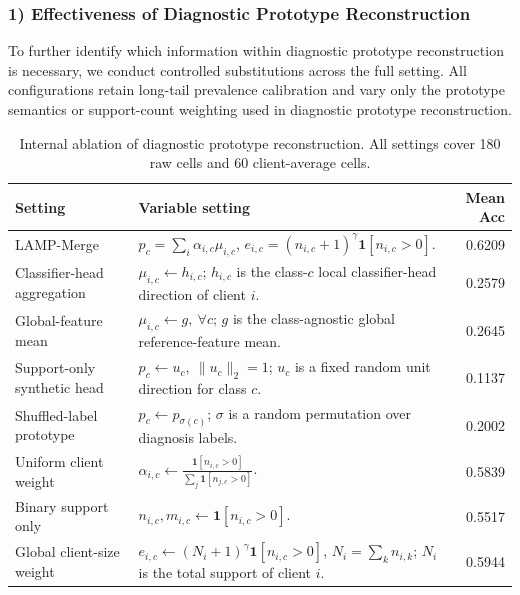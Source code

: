 \documentclass[letterpaper]{article} %
\begin{document}
\subsubsection{1) Effectiveness of Diagnostic Prototype Reconstruction}
To further identify which information within diagnostic prototype reconstruction is necessary, we conduct controlled substitutions across the full setting. All configurations retain long-tail prevalence calibration and vary only the prototype semantics or support-count weighting used in diagnostic prototype reconstruction.

\begin{table}[t]
\centering
\caption{Internal ablation of diagnostic prototype reconstruction. All settings cover 180 raw cells and 60 client-average cells.}
\label{tab:diagnostic-internal-ablation}
\scriptsize
\setlength{\tabcolsep}{2.5pt}
\begin{tabular}{p{}p{}r}
\hline
Setting & Variable setting & Mean Acc \\
\hline
LAMP-Merge & \(p_c=\sum_i\alpha_{i,c}\mu_{i,c}\), \(e_{i,c}=(n_{i,c}+1)^\gamma\mathbf{1}[n_{i,c}>0]\).  & 0.6209 \\
Classifier-head aggregation & \(\mu_{i,c}\leftarrow h_{i,c}\); \(h_{i,c}\) is the class-\(c\) local classifier-head direction of client \(i\). & 0.2579 \\
Global-feature mean & \(\mu_{i,c}\leftarrow g,\ \forall c\); \(g\) is the class-agnostic global reference-feature mean. & 0.2645 \\
Support-only synthetic head & \(p_c\leftarrow u_c,\ \|u_c\|_2=1\); \(u_c\) is a fixed random unit direction for class \(c\). & 0.1137 \\
Shuffled-label prototype & \(p_c\leftarrow p_{\sigma(c)}\); \(\sigma\) is a random permutation over diagnosis labels. & 0.2002 \\
Uniform client weight & \(\alpha_{i,c}\leftarrow \frac{\mathbf{1}[n_{i,c}>0]}{\sum_j\mathbf{1}[n_{j,c}>0]}\). & 0.5839 \\
Binary support only & \(n_{i,c},m_{i,c}\leftarrow \mathbf{1}[n_{i,c}>0]\). & 0.5517 \\
Global client-size weight & \(e_{i,c}\leftarrow (N_i+1)^\gamma\mathbf{1}[n_{i,c}>0]\), \(N_i=\sum_k n_{i,k}\); \(N_i\) is the total support of client \(i\). & 0.5944 \\
\hline
\end{tabular}
\end{table}
\end{document}
